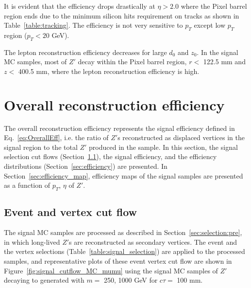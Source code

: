 It is evident that the efficiency drops drastically at $\eta > 2.0$ where the Pixel barrel region ends due to the minimum silicon hits requirement on tracks as shown in Table~\ref{table:tracking}. The efficiency is not very sensitive to $p_{T}$ except low $p_{T}$ region ($p_{T} < 20$ GeV).

The lepton reconstruction efficiency decreases for large $d_{0}$ and $z_{0}$. In the signal MC samples, most of $Z'$ decay within the Pixel barrel region, $r < $ 122.5 mm and $z < $ 400.5 mm, where the lepton reconstruction efficiency is high.

\section{Overall reconstruction efficiency}
\label{sec:combined_reco_efficiency}
The overall reconstruction efficiency represents the signal efficiency defined in Eq.~\ref{eq:OverallEff}, i.e. the ratio of $Z'$s reconstructed as displaced vertices in the signal region to the total $Z'$ produced in the sample. In this section, the signal selection cut flows (Section~\ref{sec:signal_cutflow}), the signal efficiency, and the efficiency distributions (Section~\ref{sec:efficiency}) are presented. In Section~\ref{sec:efficiency_map}, efficiency maps of the signal samples are presented as a function of $p_{T}$, $\eta$ of $Z'$.

\subsection{Event and vertex cut flow}
\label{sec:signal_cutflow}
The signal MC samples are processed as described in Section~\ref{sec:selection:pre}, in which long-lived $Z'$s are reconstructed as secondary vertices. The event and the vertex selections (Table~\ref{table:signal_selection}) are applied to the processed samples, and representative plots of these event vertex cut flow are shown in Figure~\ref{fig:signal_cutflow_MC_mumu} using the signal MC samples of $Z'$ decaying to \mumu generated with $m=$ 250, 1000 GeV for $c\tau=$ 100 mm.


